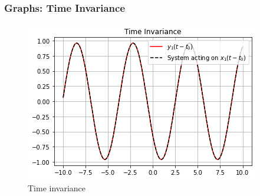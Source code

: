 \documentclass{beamer}
\begin{document}
\begin{frame}
    \frametitle{Graphs: Time Invariance}
    \begin{figure}
\begin{flushleft}
\includegraphics[width=\columnwidth]{graphs/time_invariance.png}

 \caption{Time invariance}
\end{flushleft}
\end{figure}
\end{frame}
\end{document}
